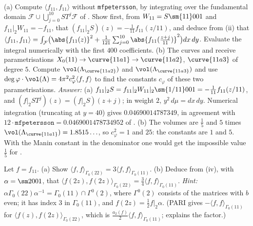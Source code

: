 \begin{exercise}\label{ex:modforms:ex-petersson-pari}
(a) Compute $\langle f_{11},f_{11}\rangle$ without \texttt{mfpetersson}, by integrating over the fundamental domain $\mathcal F\cup\bigcup_{j=0}^{10}ST^j\mathcal F$ of . Show
first, from $W_{11}=S\sm{11}001$ and $f_{11}|_2W_{11}=-f_{11}$, that $(f_{11}|_2S)(z)=-\frac1{11}f_{11}(z/11)$, and deduce from (ii) that
$\langle f_{11},f_{11}\rangle=\int_{\mathcal F}\bigl(\abs{f_{11}(z)}^2+\frac1{121}\sum_{j=0}^{10}\abs{f_{11}(\frac{z+j}{11})}^2\bigr)dx\,dy$. Evaluate the integral numerically with the first $400$
coefficients. (b) The curves  and  receive parametrisations $X_0(11)\to\curve{11a1}\to\curve{11a2}$, $\curve{11a3}$ of degree $5$. Compute
$\vol(\Lambda_{\curve{11a2}})$ and $\vol(\Lambda_{\curve{11a3}})$ and use $\deg\varphi\cdot\vol(\Lambda)=4\pi^2c_\varphi^2\langle f,f\rangle$ to find the constants $c_\varphi$ of these two parametrisations.
\emph{Answer:} (a) $f_{11}|_2S=f_{11}|_2W_{11}|_2\sm{1/11}001=-\frac1{11}f_{11}(z/11)$, and $(f|_2ST^j)(z)=(f|_2S)(z+j)$; in weight $2$, $y^2\,d\mu=dx\,dy$. Numerical integration
(truncating at $y=40$) gives $0.04690014787349$, in agreement with $12\cdot\texttt{mfpetersson}=0.0469001478734952$ of . (b) The volumes are $\frac15$ and $5$
times $\vol(\Lambda_{\curve{11a1}})=1.8515\ldots$, so $c_\varphi^2=1$ and $25$: the constants are $1$ and $5$. With the Manin constant in the
denominator one would get the impossible value $\frac15$ for .
\end{exercise}

\begin{exercise}\label{ex:modforms:ex-level22}
Let $f=f_{11}$. (a) Show $\langle f,f\rangle_{\Gamma_0(22)}=3\langle f,f\rangle_{\Gamma_0(11)}$. (b) Deduce from (iv), with $\alpha=\sm2001$, that
$\langle f(2z),f(2z)\rangle_{\Gamma_0(22)}=\frac34\langle f,f\rangle_{\Gamma_0(11)}$.
\emph{Hint:} $\alpha\Gamma_0(22)\alpha^{-1}=\Gamma_0(11)\cap\Gamma^0(2)$, where $\Gamma^0(2)$ consists of the matrices with $b$ even; it has index $3$ in $\Gamma_0(11)$, and $f(2z)=\frac12f|_2\alpha$. (PARI gives
$-\langle f,f\rangle_{\Gamma_0(11)}$ for $\langle f(z),f(2z)\rangle_{\Gamma_0(22)}$, which is $\frac{a_2(f)}2\langle f,f\rangle_{\Gamma_0(11)}$;  explains the factor.)
\end{exercise}

